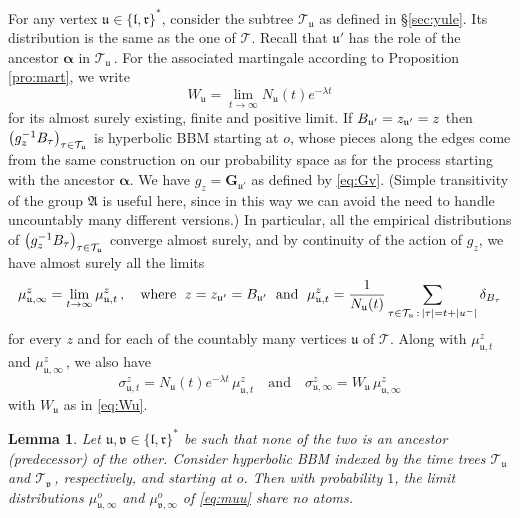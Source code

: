 \documentclass[12pt]{amsart}
\newcommand\Aff{\mathfrak A}
\newcommand\AND{\quad\text{and}\quad}
\newcommand\bal{\boldsymbol{\alpha}}
\newcommand\BB{\textit{\textbf{B}}}
\newcommand\Gb{\mathbf{G}}
\newcommand\Laa{\sigma}
\newcommand\lt{\mathfrak{l}}
\newcommand\nn{N}
\newcommand\rt{\mathfrak{r}}
\newcommand\T{\mathcal T}
\newcommand\ut{\mathfrak{u}}
\newcommand\vt{\mathfrak{v}}
\numberwithin{theorem}{section}
\newtheorem{lem}[theorem]{Lemma}%
\theoremstyle{definition}
\begin{document}
For any vertex $\ut \in \{\lt,\rt\}^*$, consider the subtree $\T_{\ut}$ as defined 
in \S \ref{sec:yule}. Its distribution is the same as the one of $\T$.
Recall that $\ut'$ has the role of the ancestor 
$\bal$ in $\T_{\ut}\,$. For the associated martingale according to Proposition 
\ref{pro:mart}, we write
\begin{equation}\label{eq:Wu}
W_{\ut} = \lim_{t \to \infty} \nn_{\ut}(t) e^{-\lambda t}
\end{equation}
for its almost surely existing, finite and positive limit. If $\BB_{\ut'} = z_{\ut'} = z$ then 
$\bigl(g_z^{-1}\BB_{\tau}\bigr)_{\tau \in \T_{\ut}}$ is hyperbolic BBM starting at $o$, 
whose pieces along the edges come from the same construction on our probability space
as for the process starting with the ancestor $\bal$. We have $g_z = \Gb_{\ut'}$ as defined
by \eqref{eq:Gv}. (Simple transitivity
of the group $\Aff$ is useful here, since in this way we can avoid the need to handle
uncountably many different versions.) 
In particular, all the 
empirical distributions of $\bigl(g_z^{-1}\BB_{\tau}\bigr)_{\tau \in \T_{\ut}}$ converge almost
surely, and by continuity of the action of $g_z$,  we have almost surely all the limits
\begin{equation}\label{eq:muu}
\mu_{\ut, \infty}^{z} %
= \lim_{t \to \infty} \mu_{\ut, t}^{z}\,, \quad \text{where }\; z=z_{\ut'} = \BB_{\ut'}\;\text{ and }\; %
\mu_{\ut, t}^{z} %
= \frac{1}{\nn_{\ut}(t)} \sum_{\tau \in \T_{\ut}\,:\, |\tau| = t+ |u^-|} 
\delta_{\BB_{\tau}}
\end{equation}
for every $z$ and
for each of the countably many vertices $\ut$ of $\T$. Along with 
$\mu_{\ut, t}^{z}$ and $\mu_{\ut, \infty}^{z}\,$, we also have
$$
\Laa_{\ut, t}^{z} = \nn_{\ut}(t)e^{-\lambda t}\,\mu_{\ut, t}^{z} \AND 
\Laa_{\ut, \infty}^{z} =  W_{\ut}\,\mu_{\ut, \infty}^{z}
$$
with $W_{\ut}$ as in \eqref{eq:Wu}.


\begin{lem}\label{lem:indep}
Let $\ut, \vt \in  \{\lt,\rt\}^*$ be such that none of the two is an ancestor (predecessor) 
of the other.
Consider hyperbolic BBM indexed by the time trees $\T_{\ut}$ and $\T_{\vt}\,$, respectively, and starting at $o$. Then with probability $1$, the limit distributions 
$\mu_{\ut, \infty}^{o}$ and $\mu_{\vt, \infty}^{o}$ of \eqref{eq:muu} share no atoms.
\end{lem}
\end{document}
